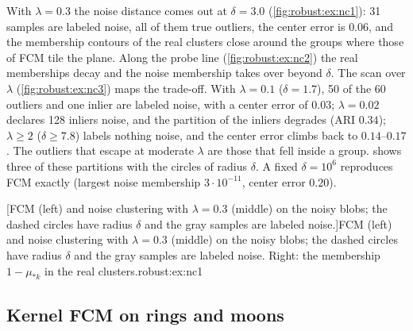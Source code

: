 With $\lambda=0.3$ the noise distance comes out at $\delta=3.0$ (\cref{fig:robust:ex:nc1}): 31 samples are labeled noise, all of them true outliers, the center error is $0.06$, and the membership contours of the real clusters close around the groups where those of FCM tile the plane. Along the probe line (\cref{fig:robust:ex:nc2}) the real memberships decay and the noise membership takes over beyond $\delta$. The scan over $\lambda$ (\cref{fig:robust:ex:nc3}) maps the trade-off. With $\lambda=0.1$ ($\delta=1.7$), 50 of the 60 outliers and one inlier are labeled noise, with a center error of $0.03$; $\lambda=0.02$ declares 128 inliers noise, and the partition of the inliers degrades (ARI $0.34$); $\lambda\ge2$ ($\delta\ge7.8$) labels nothing noise, and the center error climbs back to $0.14$--$0.17$. The outliers that escape at moderate $\lambda$ are those that fell inside a group.  shows three of these partitions with the circles of radius $\delta$. A fixed $\delta=10^6$ reproduces FCM exactly (largest noise membership $3\cdot10^{-11}$, center error $0.20$).

[FCM (left) and noise clustering with $\lambda=0.3$ (middle) on the noisy blobs; the dashed circles have radius $\delta$ and the gray samples are labeled noise.]{FCM (left) and noise clustering with $\lambda=0.3$ (middle) on the noisy blobs; the dashed circles have radius $\delta$ and the gray samples are labeled noise. Right: the membership $1-\mu_{*k}$ in the real clusters.}{robust:ex:nc1}

\subsection{Kernel FCM on rings and moons}\label{sec:robust:ex:kernel}

